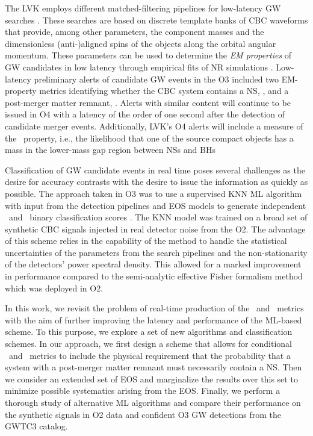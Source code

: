 The \ac{LVK} employs different matched-filtering pipelines for low-latency \ac{GW} searches \cite{Sachdev:2020lfd,Nitz_2018,Adams_2016} . These searches are based on discrete template banks of \ac{CBC} waveforms that provide, among other parameters, the component masses and the
dimensionless (anti-)aligned spins of the objects along the orbital angular momentum. These parameters can be used to determine the \emph{\ac{EM} properties} of
\ac{GW} candidates in low latency through empirical fits of \ac{NR} simulations \cite{Foucart:2012nc,Foucart:2018rjc}. Low-latency preliminary alerts of candidate
\ac{GW} events in the \ac{O3} included two \ac{EM}-property metrics identifying whether the \ac{CBC} system contains a \ac{NS}, \hasns, and a post-merger matter
remnant, \hasrem. Alerts with similar content will continue to be issued in \ac{O4} with a latency of the order of one second after the detection of candidate merger events.  Additionally, \ac{LVK}'s \ac{O4} alerts will include a measure of the \hasgap\ property, i.e., the likelihood that one of the source compact objects has a mass in the lower-mass gap region between \ac{NS}s and \ac{BH}s

Classification of \ac{GW} candidate events in real time poses several challenges as the desire for accuracy contrasts with the desire to issue the information as
quickly as possible. The approach taken in \ac{O3} was to use a supervised \ac{KNN} \cite{Pedregosa:2011ork} \ac{ML} algorithm with input from the detection pipelines
and \ac{EOS} models to generate independent \hasns\ and \hasrem\ binary classification scores \cite{Chatterjee:2019avs}. The \ac{KNN} model was trained on a broad set
of synthetic \ac{CBC} signals injected in real detector noise from the \ac{O2}. The advantage of this scheme relies in the capability of the method to handle the
statistical uncertainties of the parameters from the search pipelines and the non-stationarity of the detectors' power spectral density. This allowed for a marked
improvement in performance compared to the semi-analytic effective Fisher formalism method which was deployed in \ac{O2}.

In this work, we revisit the problem of real-time production of the \hasns\ and \hasrem\ metrics with the aim of further improving the latency and performance of the
\ac{ML}-based scheme. To this purpose, we explore a set of new algorithms and classification schemes. In our approach, we first design a scheme that allows for
conditional \hasns\ and \hasrem\ metrics to include the physical requirement that the probability that a system with a post-merger matter remnant must necessarily
contain a \ac{NS}. Then we consider an extended set of \ac{EOS} and marginalize the results over this set to minimize possible systematics arising from the \ac{EOS}.
Finally, we perform a thorough study of alternative \ac{ML} algorithms and compare their performance on the synthetic signals in \ac{O2} data and confident \ac{O3}
\ac{GW} detections from the \ac{GWTC3} catalog.

